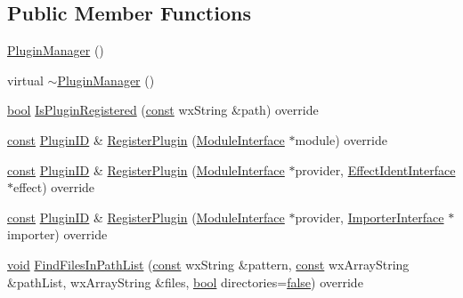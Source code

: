 \subsection*{Public Member Functions}
\begin{DoxyCompactItemize}
\item 
\hyperlink{class_plugin_manager_a25f1e568d8d923e4d2a4f777516b4be5}{Plugin\+Manager} ()
\item 
virtual \hyperlink{class_plugin_manager_ab657302ef5af357907ae11ad817f5dfc}{$\sim$\+Plugin\+Manager} ()
\item 
\hyperlink{mac_2config_2i386_2lib-src_2libsoxr_2soxr-config_8h_abb452686968e48b67397da5f97445f5b}{bool} \hyperlink{class_plugin_manager_a83c541be2ce40d1e2a397ee36c7d0aba}{Is\+Plugin\+Registered} (\hyperlink{getopt1_8c_a2c212835823e3c54a8ab6d95c652660e}{const} wx\+String \&path) override
\item 
\hyperlink{getopt1_8c_a2c212835823e3c54a8ab6d95c652660e}{const} \hyperlink{include_2audacity_2_types_8h_abe9b737fcebc2b5bea606246e1eab52e}{Plugin\+ID} \& \hyperlink{class_plugin_manager_ad58899e0639d0454b4457628aa4d7d1e}{Register\+Plugin} (\hyperlink{class_module_interface}{Module\+Interface} $\ast$module) override
\item 
\hyperlink{getopt1_8c_a2c212835823e3c54a8ab6d95c652660e}{const} \hyperlink{include_2audacity_2_types_8h_abe9b737fcebc2b5bea606246e1eab52e}{Plugin\+ID} \& \hyperlink{class_plugin_manager_afb6ce139128c710ef604ab4386becdcb}{Register\+Plugin} (\hyperlink{class_module_interface}{Module\+Interface} $\ast$provider, \hyperlink{class_effect_ident_interface}{Effect\+Ident\+Interface} $\ast$effect) override
\item 
\hyperlink{getopt1_8c_a2c212835823e3c54a8ab6d95c652660e}{const} \hyperlink{include_2audacity_2_types_8h_abe9b737fcebc2b5bea606246e1eab52e}{Plugin\+ID} \& \hyperlink{class_plugin_manager_aa2433b1202c9a4e3d7f5025d86a9a5b3}{Register\+Plugin} (\hyperlink{class_module_interface}{Module\+Interface} $\ast$provider, \hyperlink{class_importer_interface}{Importer\+Interface} $\ast$importer) override
\item 
\hyperlink{sound_8c_ae35f5844602719cf66324f4de2a658b3}{void} \hyperlink{class_plugin_manager_ab48ee86171bfac426ada64136d37dec9}{Find\+Files\+In\+Path\+List} (\hyperlink{getopt1_8c_a2c212835823e3c54a8ab6d95c652660e}{const} wx\+String \&pattern, \hyperlink{getopt1_8c_a2c212835823e3c54a8ab6d95c652660e}{const} wx\+Array\+String \&path\+List, wx\+Array\+String \&files, \hyperlink{mac_2config_2i386_2lib-src_2libsoxr_2soxr-config_8h_abb452686968e48b67397da5f97445f5b}{bool} directories=\hyperlink{mac_2config_2i386_2lib-src_2libsoxr_2soxr-config_8h_a65e9886d74aaee76545e83dd09011727}{false}) override

\end{DoxyCompactItemize}
